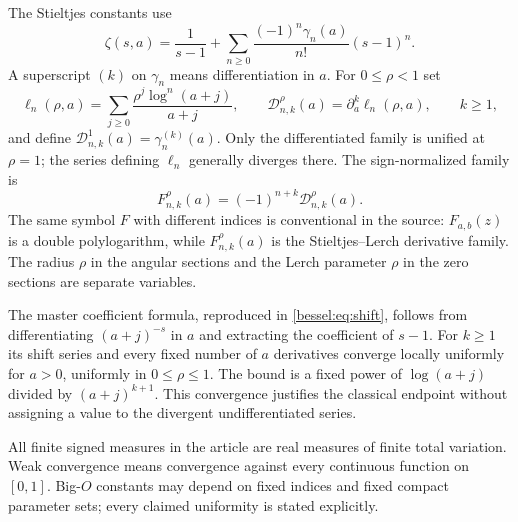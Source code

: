The Stieltjes constants use
\[
 \zeta(s,a)=\frac1{s-1}
  +\sum_{n\ge0}\frac{(-1)^n\gamma_n(a)}{n!}(s-1)^n.
\]
A superscript $(k)$ on $\gamma_n$ means differentiation in $a$.
For $0\le\rho<1$ set
\[
 \ell_n(\rho,a)=\sum_{j\ge0}\frac{\rho^j\log^n(a+j)}{a+j},
 \qquad
 \mathcal D_{n,k}^{\rho}(a)=\partial_a^k\ell_n(\rho,a),
 \qquad k\ge1,
\]
and define $\mathcal D_{n,k}^{1}(a)=\gamma_n^{(k)}(a)$.
Only the differentiated family is unified at $\rho=1$; the series
defining $\ell_n$ generally diverges there. The sign-normalized family is
\[
 F_{n,k}^{\rho}(a)=(-1)^{n+k}\mathcal D_{n,k}^{\rho}(a).
\]
The same symbol $F$ with different indices is conventional in the
source: $F_{a,b}(z)$ is a double polylogarithm, while
$F_{n,k}^{\rho}(a)$ is the Stieltjes--Lerch derivative family.
The radius $\rho$ in the angular sections and the Lerch parameter
$\rho$ in the zero sections are separate variables.

The master coefficient formula, reproduced in
\eqref{bessel:eq:shift}, follows from differentiating
$(a+j)^{-s}$ in $a$ and extracting the coefficient of $s-1$.
For $k\ge1$ its shift series and every fixed number of $a$
derivatives converge locally uniformly for $a>0$, uniformly in
$0\le\rho\le1$. The bound is a fixed power of
$\log(a+j)$ divided by $(a+j)^{k+1}$.
This convergence justifies the classical endpoint without assigning
a value to the divergent undifferentiated series.

All finite signed measures in the article are real measures of finite
total variation. Weak convergence means convergence against every
continuous function on $[0,1]$. Big-$O$ constants may depend on fixed
indices and fixed compact parameter sets; every claimed uniformity is
stated explicitly.
